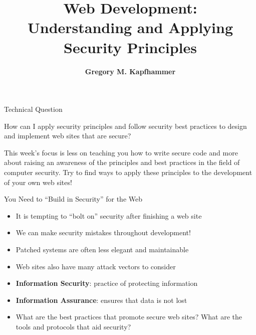 \documentclass[14pt,aspectratio=169]{beamer}
\title{Web Development: \\ Understanding and Applying\\ Security Principles}
\author{{\bf Gregory M. Kapfhammer}}
\institute[shortinst]{{\bf Department of Computer Science, Allegheny College}}
\begin{document}
{
  \begin{frame}
    \titlepage
  \end{frame}
}

%
\begin{frame}{Technical Question}
  \hspace*{.15in}
  \begin{minipage}{5in}
    \vspace*{.5in}
    \begin{center}
      {\large How can I apply security principles and follow security best
      practices to design and implement web sites that are secure?}
    \end{center}
  \end{minipage}
  \vspace{1ex}
  \begin{center}
    \small This week's focus is less on teaching you how to write secure code
    and more about raising an awareness of the principles and best practices in
    the field of computer security. Try to find ways to apply these principles
    to the development of your own web sites! \\
  \end{center}
\end{frame}

%
\begin{frame}{You Need to ``Build in Security'' for the Web}
  \begin{itemize}
    \item It is tempting to ``bolt on'' security after finishing a web site
      \vspace*{-.15in}
    \item We can make security mistakes throughout development!
      \vspace*{-.15in}
    \item Patched systems are often less elegant and maintainable
      \vspace*{-.15in}
    \item Web sites also have many attack vectors to consider
      \vspace*{-.15in}
    \item {\bf Information Security}: practice of protecting information
      \vspace*{-.15in}
    \item {\bf Information Assurance}: ensures that data is not lost
      \vspace*{-.15in}
    \item What are the best practices that promote secure web sites? What are
      the tools and protocols that aid security?
  \end{itemize}
\end{frame}
\end{document}
